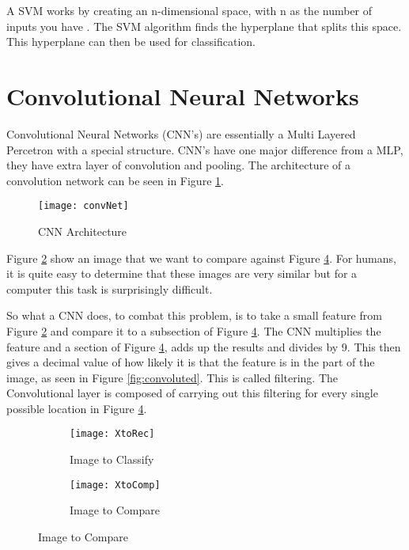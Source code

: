 A SVM works by creating an n-dimensional space, with n as the number of
inputs you have \textcite{svm}. The SVM algorithm finds the hyperplane that splits this space.
This hyperplane can then be used for classification.

\section{Convolutional Neural Networks}
Convolutional Neural Networks (CNN's) are essentially a Multi Layered Percetron with a
special structure. CNN's have one major difference from a MLP, they have extra
layer of convolution and pooling. The architecture of a convolution network can
be seen in Figure \ref{fig:convNet}.

\begin{figure}
	\texttt{[image: convNet]}
	\caption{CNN Architecture}
	\label{fig:convNet}
\end{figure}

Figure \ref{fig:XtoRec} show an image that we want to compare against
Figure \ref{fig:XtoComp}.
For humans, it is quite easy to determine that these images are very similar but
for a computer this task is surprisingly difficult.

So what a CNN does, to combat this problem, is to take a small feature from
Figure \ref{fig:XtoRec} and compare it to a subsection of Figure \ref{fig:XtoComp}.
The CNN multiplies the feature and a section of Figure \ref{fig:XtoComp}, adds
up the results and divides by 9. This then gives a decimal value of how likely
it is that the feature is in the part of the image, as seen in Figure
\ref{fig:convoluted}.
This is called filtering. The Convolutional layer is composed of carrying out
this filtering for every single possible location in Figure \ref{fig:XtoComp}.
\begin{figure}
	\caption{Image filtering}
    \label{fig:filter}
      \begin{subfigure}[b]{0.4\textwidth}
          \texttt{[image: XtoRec]}
          \caption{Image to Classify}
          \label{fig:XtoRec}
      \end{subfigure}
      \begin{subfigure}[b]{0.4\textwidth}
      \texttt{[image: XtoComp]}
      \caption{Image to Compare}
      \label{fig:XtoComp}
      \end{subfigure}
\end{figure}

